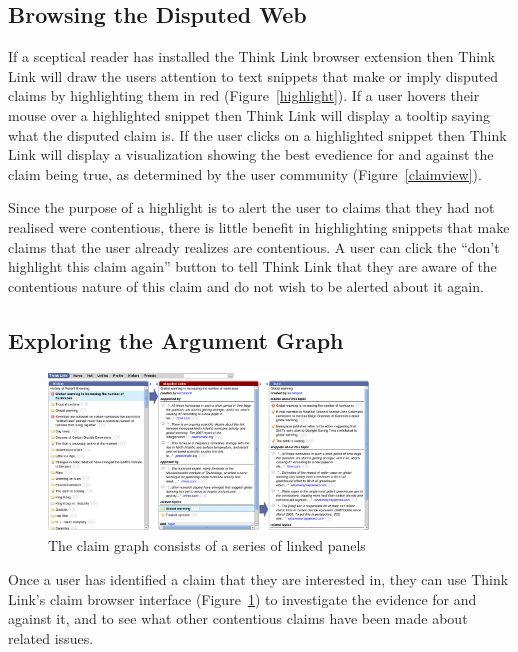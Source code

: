 \documentclass{chi2009}
\newcommand{\todo}[1]{}
\begin{document}
\subsection{Browsing the Disputed Web}

If a sceptical reader has installed the Think Link browser extension then Think Link will draw the users attention to text snippets that make or imply disputed claims by highlighting them in red (Figure~\ref{highlight}). If a user hovers their mouse over a highlighted snippet then Think Link will display a tooltip saying what the disputed claim is. If the user clicks on a highlighted snippet then Think Link will display a visualization showing the best evedience for and against the claim being true, as determined by the user community (Figure~\ref{claimview}). 

Since the purpose of a highlight is to alert the user to claims that they had not realised were contentious, there is little benefit in highlighting snippets that make claims that the user already realizes are contentious. A user can click the ``don't highlight this claim again'' button to tell Think Link that they are aware of the contentious nature of this claim and do not wish to be alerted about it again.

\todo{ignore button}
\todo{talk about the margin?}

\subsection{Exploring the Argument Graph}

\begin{figure}[tb]
	\begin{center}
	\includegraphics[width=8.5cm]{../screenshots/v2_panels.png}
	\caption{The claim graph consists of a series of linked panels}
	\label{panels}
	\end{center}
\end{figure}

Once a user has identified a claim that they are interested in, they can use Think Link's claim browser interface (Figure~\ref{panels}) to investigate the evidence for and against it, and to see what other contentious claims have been made about related issues. 
\end{document}
